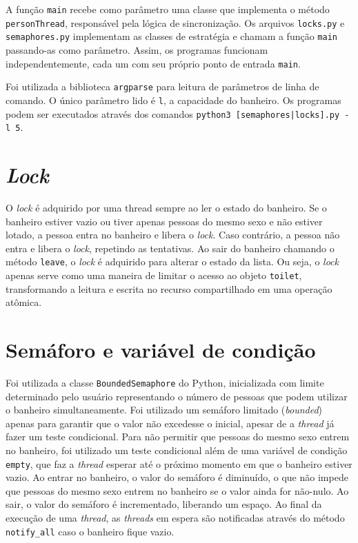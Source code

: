 \documentclass[12pt, a4paper]{article}
\newcommand{\code}[1]{{\lstinline{#1}}}
\begin{document}
A função \code{main} recebe como parâmetro uma classe que implementa o método
\code{personThread}, responsável pela lógica de sincronização. Os arquivos
\code{locks.py} e \code{semaphores.py} implementam as classes de estratégia e
chamam a função \code{main} passando-as como parâmetro. Assim, os programas
funcionam independentemente, cada um com seu próprio ponto de entrada
\code{main}.

Foi utilizada a biblioteca \code{argparse} para leitura de parâmetros de linha
de comando. O único parâmetro lido é \code{l}, a capacidade do banheiro. Os
programas podem ser executados através dos comandos \code{python3
[semaphores|locks].py -l 5}.

\section{\emph{Lock}}
O \emph{lock} é adquirido por uma thread sempre ao ler o estado do banheiro. Se
o banheiro estiver vazio ou tiver apenas pessoas do mesmo sexo e não estiver
lotado, a pessoa entra no banheiro e libera o \emph{lock}. Caso contrário, a
pessoa não entra e libera o \emph{lock}, repetindo as tentativas. Ao sair do
banheiro chamando o método \code{leave}, o \emph{lock} é adquirido para alterar
o estado da lista.  Ou seja, o \emph{lock} apenas serve como uma maneira de
limitar o acesso ao objeto \code{toilet}, transformando a leitura e escrita no
recurso compartilhado em uma operação atômica.

\section{Semáforo e variável de condição}
Foi utilizada a classe \code{BoundedSemaphore} do Python, inicializada com
limite determinado pelo usuário representando o número de pessoas que podem
utilizar o banheiro simultaneamente. Foi utilizado um semáforo limitado
(\emph{bounded}) apenas para garantir que o valor não excedesse o inicial,
apesar de a \emph{thread} já fazer um teste condicional. Para não permitir que
pessoas do mesmo sexo entrem no banheiro, foi utilizado um teste condicional
além de uma variável de condição \code{empty}, que faz a \emph{thread} esperar
até o próximo momento em que o banheiro estiver vazio. Ao entrar no banheiro, o
valor do semáforo é diminuído, o que não impede que pessoas do mesmo sexo
entrem no banheiro se o valor ainda for não-nulo. Ao sair, o valor do semáforo
é incrementado, liberando um espaço. Ao final da execução de uma \emph{thread},
as \emph{threads} em espera são notificadas através do método \code{notify_all}
caso o banheiro fique vazio.
\end{document}
